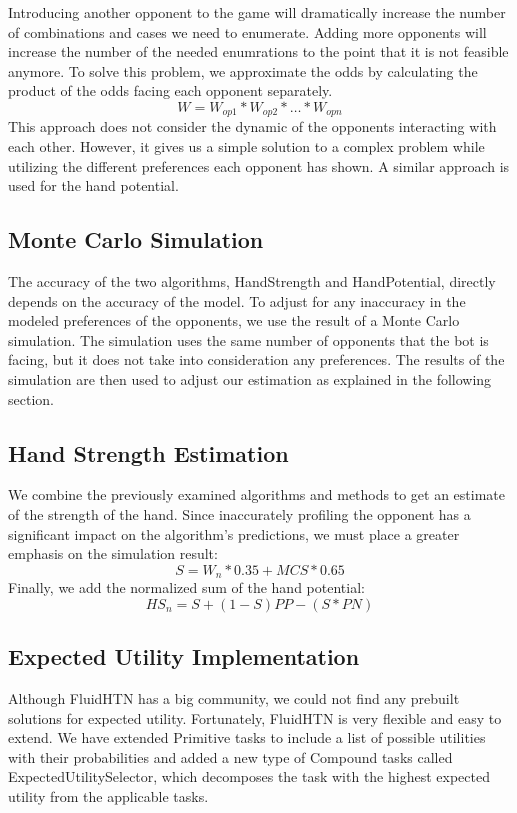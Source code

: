 Introducing another opponent to the game will dramatically increase the number of combinations and cases we need to enumerate. Adding more opponents will increase the number of the needed enumrations to the point that it is not feasible anymore. To solve this problem, we approximate the odds by calculating the product of the odds facing each opponent separately.
$$W = W_{op1} * W_{op2} * \dots * W_{opn}$$
This approach does not consider the dynamic of the opponents interacting with each other. However, it gives us a simple solution to a complex problem while utilizing the different preferences each opponent has shown. A similar approach is used for the hand potential.


\subsection{Monte Carlo Simulation}
The accuracy of the two algorithms, HandStrength and HandPotential, directly depends on the accuracy of the model. To adjust for any inaccuracy in the modeled preferences of the opponents, we use the result of a Monte Carlo simulation. The simulation uses the same number of opponents that the bot is facing, but it does not take into consideration any preferences. The results of the simulation are then used to adjust our estimation as explained in the following section.

\subsection{Hand Strength Estimation}

We combine the previously examined algorithms and methods to get an estimate of the strength of the hand. Since inaccurately profiling the opponent has a significant impact on the algorithm's predictions, we must place a greater emphasis on the simulation result:
$$S = W_n * 0.35 + MCS * 0.65$$
Finally, we add the normalized sum of the hand potential:
$$HS_n = S + (1-S) PP - (S * PN)$$

\subsection{Expected Utility Implementation}
Although FluidHTN has a big community, we could not find any prebuilt solutions for expected utility. Fortunately, FluidHTN is very flexible and easy to extend. We have extended Primitive tasks to include a list of possible utilities with their probabilities and added a new type of Compound tasks called ExpectedUtilitySelector, which decomposes the task with the highest expected utility from the applicable tasks.

